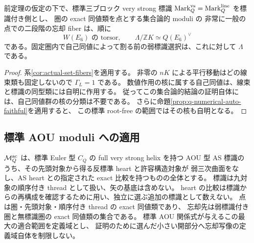\begin{corollary}
\label{cor:very-general-actual-fibers}
前定理の仮定の下で、標準三ブロック very strong 標識
$\operatorname{Mark}^{\rm vs}_Q=\operatorname{Mark}^{\rm line}_Q$ を標識付き側とし、
圏の exact 同値類を点とする集合論的 moduli の
非常に一般の点での二段階の忘却 fiber は、順に
\[
 W(E_6)\text{ の torsor},\qquad
 \Lambda/\mathbb ZK\simeq Q(E_6)^\vee
\]
である。固定圏内で自己同値によって割る前の弱標識選択は、これに対して $\Lambda$ である。
\end{corollary}
\begin{proof}
系\ref{cor:actual-set-fibers}を適用する。
非零の $nK$ による平行移動はどの線束類も固定しないので $\Gamma_L=1$ である。
数値作用の核に属する自己同値は、線束と標識の同型類には自明に作用する。
従ってこの集合論的結論の証明自体には、自己同値群の核の分類は不要である。
さらに命題\ref{prop:q-numerical-auto-faithful}を適用すると、
この標準 root-free の範囲ではその核も自明となる。
\end{proof}

\subsection{標準 AOU moduli への適用}

\begin{definition}[弱公理に適合する標準標識の定義域]
\label{def:maximal-weak-compatible-aou}
$\mathcal M_Q^{\rm ac}$ は、標準 Euler 型 $C_Q$ の full very strong helix を持つ
AOU 型 AS 標識のうち、その先頭対象から得る反標準 heart と許容構造対象が
弱三次曲面をなし、AS heart との指定された exact 比較を持つものの全体とする。
標識は九対象の順序付き thread として扱い、矢の基底は含めない。
heart の比較は標識からの再構成を確認するために用い、独立に選ぶ追加の標識として数えない。
点は圏・先頭対象・順序付き thread の exact 同値類であり、
忘却先は弱標識付き圏と無標識圏の exact 同値類の集合である。
標準 AOU 関係式が与えるこの最大の適合範囲を定義域とし、
証明のために選んだ小さい開部分へ忘却写像の定義域自体を制限しない。
\end{definition}

